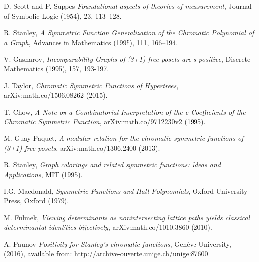 \documentclass{article}
\theoremstyle{plain}
\theoremstyle{definition}
\begin{document}
\begin{thebibliography}{1}


 D. Scott and P. Suppes  \emph{Foundational aspects of theories of measurement}, Journal of Symbolic Logic (1954), 23, 113–128.


 R. Stanley, \emph{A Symmetric Function
    Generalization of the Chromatic Polynomial of a Graph}, Advances
  in Mathematics (1995), 111, 166--194.

 V. Gasharov, \emph{Incomparability Graphs of
    (3+1)-free posets are s-positive}, Discrete Mathematics (1995), 157, 193-197.

 J. Taylor, \emph{ Chromatic Symmetric Functions of Hypertrees}, arXiv:math.co/1506.08262 (2015).

 T. Chow, \emph{A Note on a Combinatorial Interpretation of the e-Coefficients of the Chromatic Symmetric Function}, arXiv:math.co/9712230v2 (1995).

 M. Guay-Paquet, \emph{A modular relation for the chromatic symmetric functions of (3+1)-free posets}, arXiv:math.co/1306.2400 (2013).

 R. Stanley, \emph{Graph colorings and related symmetric functions: Ideas and Applications}, MIT (1995).

 I.G. Macdonald, \emph{Symmetric Functions and
    Hall Polynomials}, Oxford University Press, Oxford (1979).

 M. Fulmek, \emph{Viewing determinants as nonintersecting lattice paths yields classical determinantal identities bijectively}, arXiv:math.co/1010.3860 (2010).


 A. Paunov \emph{Positivity for Stanley's chromatic functions}, Genève University, (2016), available from:  http://archive-ouverte.unige.ch/unige:87600





\end{thebibliography}
\end{document}
